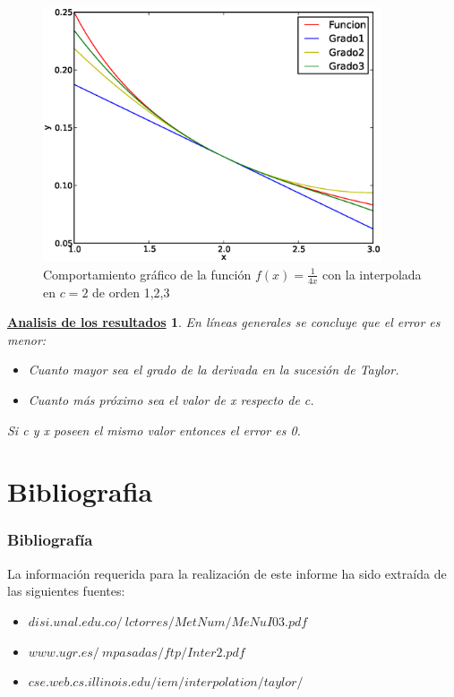 \documentclass{beamer}
\newtheorem{descripcion de los experimentos}{\underline {Descripcion de los experimentos}}
\newtheorem{analisis}{\underline {Analisis de los resultados}}
\begin{document}
\begin{frame}\label{siguiente}
\begin{figure}\label{transparencia grafica3}
  \caption{Comportamiento gráfico de la función $f(x)=\frac{1}{4x}$ con la interpolada en $c=2$ de orden 1,2,3}
  \includegraphics[width=10cm]{img/sexta.eps}
\end{figure}
\end{frame}

\begin{frame}
\begin{analisis}\label{siguiente}
En líneas generales se concluye que el error es menor:
\begin {itemize}
\item Cuanto mayor sea el grado de la derivada en la sucesión de Taylor.
\item Cuanto más próximo sea el valor de x respecto de c.
\end {itemize}
\begin {block}{Si c y x poseen el mismo valor entonces el error es 0.}
\end{block}
\end{analisis}
\end{frame}


\section{Bibliografia}
\begin{frame}
 \frametitle{Bibliografía}

   La información requerida para la realización de este informe ha sido extraída de las siguientes fuentes:

  \begin{thebibliography}{10}
    \beamertemplatebookbibitems
\begin{itemize}
\item \href{disi.unal.edu.co/~lctorres/MetNum/MeNuI03.pdf}{$disi.unal.edu.co/~lctorres/MetNum/MeNuI03.pdf$}
\item \href{www.ugr.es/~mpasadas/ftp/Inter2.pdf}{$www.ugr.es/~mpasadas/ftp/Inter2.pdf$}
\item \href{cse.web.cs.illinois.edu/iem/interpolation/taylor/}{$cse.web.cs.illinois.edu/iem/interpolation/taylor/$}
\end {itemize}
  \end{thebibliography}
\end{frame}
\end{document}
